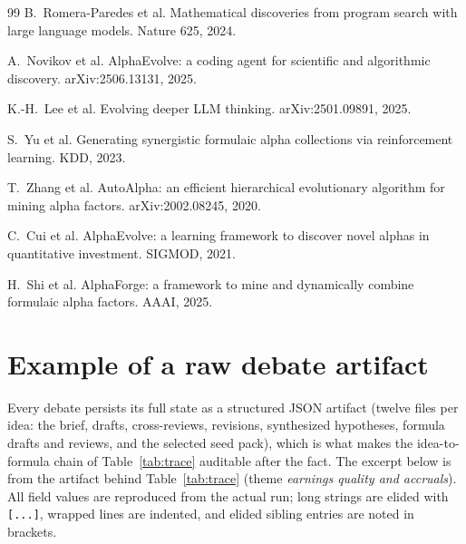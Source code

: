 \documentclass{article}
\theoremstyle{definition}
\theoremstyle{plain}
\theoremstyle{remark}
\begin{document}
\begin{thebibliography}{99}
 B.~Romera-Paredes et al. Mathematical discoveries from program
search with large language models. Nature 625, 2024.

 A.~Novikov et al. AlphaEvolve: a coding agent for scientific
and algorithmic discovery. arXiv:2506.13131, 2025.

 K.-H.~Lee et al. Evolving deeper LLM thinking. arXiv:2501.09891,
2025.

 S.~Yu et al. Generating synergistic formulaic alpha collections via
reinforcement learning. KDD, 2023.

 T.~Zhang et al. AutoAlpha: an efficient hierarchical
evolutionary algorithm for mining alpha factors. arXiv:2002.08245, 2020.

 C.~Cui et al. AlphaEvolve: a learning framework to
discover novel alphas in quantitative investment. SIGMOD, 2021.

 H.~Shi et al. AlphaForge: a framework to mine and dynamically
combine formulaic alpha factors. AAAI, 2025.

\end{thebibliography}

\appendix
\section{Example of a raw debate artifact}
\label{app:artifact}

Every debate persists its full state as a structured JSON artifact (twelve files per
idea: the brief, drafts, cross-reviews, revisions, synthesized hypotheses, formula
drafts and reviews, and the selected seed pack), which is what makes the
idea-to-formula chain of Table~\ref{tab:trace} auditable after the fact. The excerpt
below is from the artifact behind Table~\ref{tab:trace} (theme \emph{earnings quality
and accruals}). All field values are reproduced from the actual run; long strings are
elided with \texttt{[...]}, wrapped lines are indented, and elided sibling entries are
noted in brackets.
\end{document}
